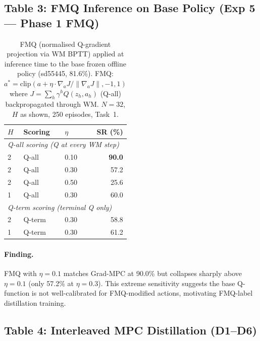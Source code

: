 \documentclass[11pt]{article}
\newcommand{\best}[1]{\textbf{#1}}
\begin{document}
\subsection*{Table 3: FMQ Inference on Base Policy (Exp 5 --- Phase 1 FMQ)}

\begin{table}[h]
\centering
\caption{FMQ (normalised Q-gradient projection via WM BPTT) applied at inference time
  to the base frozen offline policy (sd55445, 81.6\%).
  FMQ: $a^* = \text{clip}(a + \eta \cdot \nabla_a J / \|\nabla_a J\|, -1, 1)$
  where $J = \sum_h \gamma^h Q(z_h, a_h)$ (Q-all) backpropagated through WM.
  $N=32$, $H$ as shown, 250 episodes, Task~1.}
\begin{tabular}{lllr}
\toprule
$H$ & Scoring & $\eta$ & SR (\%) \\
\midrule
\multicolumn{4}{l}{\textit{Q-all scoring (Q at every WM step)}} \\
2 & Q-all  & 0.10 & \best{90.0} \\
2 & Q-all  & 0.30 & 57.2 \\
2 & Q-all  & 0.50 & 25.6 \\
1 & Q-all  & 0.30 & 60.0 \\
\midrule
\multicolumn{4}{l}{\textit{Q-term scoring (terminal Q only)}} \\
2 & Q-term & 0.30 & 58.8 \\
1 & Q-term & 0.30 & 61.2 \\
\bottomrule
\end{tabular}
\end{table}

\paragraph{Finding.}
FMQ with $\eta=0.1$ matches Grad-MPC at 90.0\% but collapses sharply above $\eta=0.1$
(only 57.2\% at $\eta=0.3$). This extreme sensitivity suggests the base Q-function is
not well-calibrated for FMQ-modified actions, motivating FMQ-label distillation training.

\subsection*{Table 4: Interleaved MPC Distillation (D1--D6)}
\end{document}
